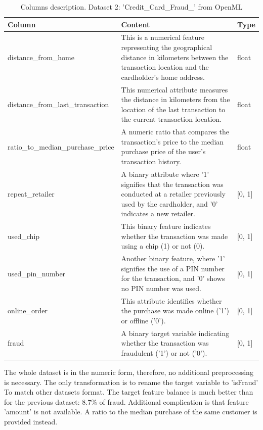 \documentclass[12pt,a4paper, hidelinks]{article}
\begin{document}
\begin{table}[ht!]
    \centering
    \begin{tabular}{|p{5.5cm}|p{8cm}|p{2cm}|}
    \hline
    \textbf{Column} & \textbf{Content} & \textbf{Type} \\
    \hline
    distance\_from\_home & This is a numerical feature representing the geographical distance in kilometers between the transaction location and the cardholder's home address. & float \\
    \hline
    distance\_from\_last\_transaction & This numerical attribute measures the distance in kilometers from the location of the last transaction to the current transaction location. & float \\
    \hline
    ratio\_to\_median\_purchase\_price & A numeric ratio that compares the transaction's price to the median purchase price of the user's transaction history. & float \\
    \hline
    repeat\_retailer & A binary attribute where '1' signifies that the transaction was conducted at a retailer previously used by the cardholder, and '0' indicates a new retailer. & [0, 1] \\
    \hline
    used\_chip & This binary feature indicates whether the transaction was made using a chip (1) or not (0). & [0, 1] \\
    \hline
    used\_pin\_number &  Another binary feature, where '1' signifies the use of a PIN number for the transaction, and '0' shows no PIN number was used. & [0, 1] \\
    \hline
    online\_order & This attribute identifies whether the purchase was made online ('1') or offline ('0'). & [0, 1] \\
    \hline
    fraud & A binary target variable indicating whether the transaction was fraudulent ('1') or not ('0'). & [0, 1] \\
    \hline
    \end{tabular}
    \caption{Columns description. Dataset 2: 'Credit\_Card\_Fraud\_' from OpenML}
\end{table}

The whole dataset is in the numeric form, therefore, no additional preprocessing is necessary. The only transformation is to rename the target variable to 'isFraud' To match other datasets format.
The target feature balance is much better than for the previous dataset: 8.7\% of fraud. Additional complication is that feature 'amount' is not available. A ratio to the median purchase of the same customer is provided instead.
\end{document}
